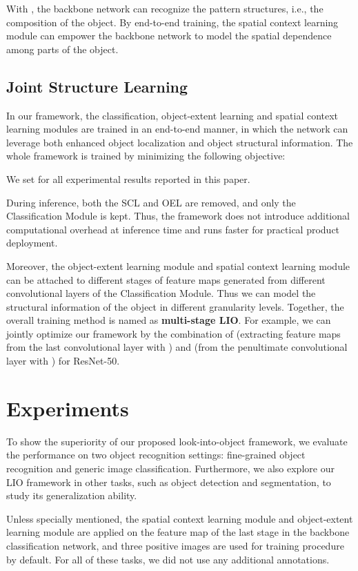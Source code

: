 \documentclass[10pt,twocolumn,letterpaper]{article}
\begin{document}
With , the backbone network can recognize the pattern structures, i.e., the composition of the object. By end-to-end training, the spatial context learning module can empower the backbone network to model the spatial dependence among parts of the object.

\subsection{Joint Structure Learning}
In our framework, the classification, object-extent learning and spatial context learning modules are trained in an end-to-end manner, in which the network can leverage both enhanced object localization and object structural information. The whole framework is trained by minimizing the following objective:

We set  for all experimental results reported in this paper.

During inference, both the SCL and OEL are removed, and only the Classification Module is kept. Thus, the framework does not introduce additional computational overhead at inference time and runs faster for practical product deployment.

Moreover, the object-extent learning module and spatial context learning module can be attached to different stages of feature maps generated from different convolutional layers of the Classification Module. Thus we can model the structural information of the object in different granularity levels. Together, the overall training method is named as \textbf{multi-stage LIO}. For example, we can jointly optimize our framework by the combination of  (extracting feature maps from the last convolutional layer with ) and  (from the penultimate convolutional layer with ) for ResNet-50.

\section{Experiments} \label{sec:experiments}
To show the superiority of our proposed look-into-object framework, we evaluate the performance on two object recognition settings: fine-grained object recognition and generic image classification. Furthermore, we also explore our LIO framework in other tasks, such as object detection and segmentation, to study its generalization ability. 

Unless specially mentioned, the spatial context learning module and object-extent learning module are applied on the feature map of the last stage in the backbone classification network, and three positive images are used for training procedure by default. 
For all of these tasks, we did not use any additional annotations.
\end{document}
